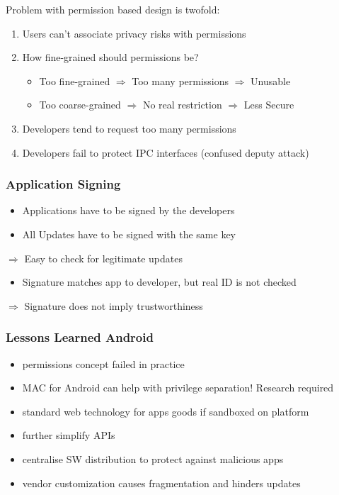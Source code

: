 Problem with permission based design is twofold:
\begin{enumerate}
    \item Users can't associate privacy risks with permissions
    \item How fine-grained should permissions be?
      \begin{itemize}
	\item Too fine-grained $\Rightarrow$ Too many permissions $\Rightarrow$ Unusable
	\item Too coarse-grained $\Rightarrow$ No real restriction $\Rightarrow$ Less Secure
      \end{itemize}
    \item Developers tend to request too many permissions
    \item Developers fail to protect IPC interfaces (confused deputy attack)
\end{enumerate}

\subsubsection{Application Signing}
\begin{itemize}
	\item Applications have to be signed by the developers
	\item All Updates have to be signed with the same key
\end{itemize}
$\Rightarrow$ Easy to check for legitimate updates
\begin{itemize}
\item Signature matches app to developer, but real ID is not checked
\end{itemize}
$\Rightarrow$ Signature does not imply trustworthiness

\subsubsection{Lessons Learned Android}
\begin{itemize}
    \item permissions concept failed in practice
    \item MAC for Android can help with privilege separation! Research required
    \item standard web technology for apps goods if sandboxed on platform
    \item further simplify APIs
    \item centralise SW distribution to protect against malicious apps
    \item vendor customization causes fragmentation and hinders updates
\end{itemize}

